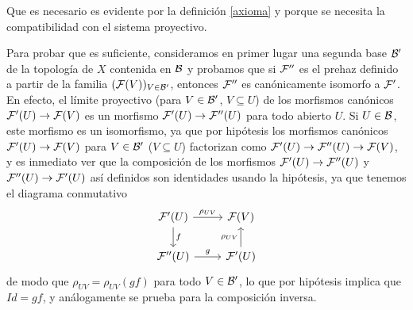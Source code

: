 \documentclass[twoside]{article}
\begin{document}
\begin{dem}
Que es necesario es evidente por la definición \ref{axioma} y porque se necesita la compatibilidad con el sistema proyectivo. %






Para probar que es suficiente, consideramos en primer lugar una segunda base ${\mathcal B}'$ de la topología de $X$ contenida en ${\mathcal B}$ y probamos que si $\mathcal{F}''$ es el prehaz definido a partir de la familia $(\mathcal{F}(V))_{V\in{\mathcal B}'}$, entonces $\mathcal{F}''$ es canónicamente isomorfo a $\mathcal{F}'$. %
En efecto, el límite proyectivo (para $V\in{\mathcal B}'$, $V\subseteq U$) de los morfismos canónicos $\mathcal{F}'(U)\to \mathcal{F}(V)$ es un morfismo $\mathcal{F}'(U)\to\mathcal{F}''(U)$ para todo abierto $U$. Si $U\in{\mathcal B}$, este morfismo es un isomorfismo, ya que por hipótesis los morfismos canónicos $\mathcal{F}'(U)\to\mathcal{F}(V)$ para $V\in{\mathcal B}'$ ($V\subseteq U$) factorizan como $\mathcal{F}'(U)\to\mathcal{F}''(U)\to\mathcal{F}(V)$, y es inmediato ver que la composición de los morfismos $\mathcal{F}'(U)\to\mathcal{F}''(U)$ y $\mathcal{F}''(U)\to\mathcal{F}'(U)$ así definidos son identidades usando la hipótesis, ya que tenemos el diagrama conmutativo
\[
\begin{tikzcd}
\calF'(U)\arrow[r, "\rho_{UV}"] \arrow[d, "f"] & \calF(V)\\
\calF''(U)\arrow[r, "g"] & \calF'(U)\arrow[u, "\rho_{UV}"]
\end{tikzcd}
\]
de modo que $\rho_{UV}=\rho_{UV}(gf)$ para todo $V\in{\mathcal B}'$, lo que por hipótesis implica que $Id=gf$, y análogamente se prueba para la composición inversa. %


\end{dem}
\end{document}
